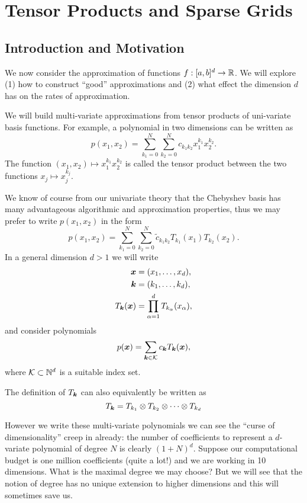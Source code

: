 
\section{Tensor Products and Sparse Grids}
%
\label{sec:sparse}

\subsection{Introduction and Motivation}
%
\label{sec:sparse:intro}
%
We now consider the approximation of functions $f : [a,b]^d \to \mathbb{R}$. We will
explore (1) how to construct ``good'' approximations and (2) what effect the
dimension $d$ has on the rates of approximation.

We will build multi-variate approximations from tensor products of uni-variate
basis functions. For example, a polynomial in two dimensions can be written
as
\[
  p(x_1, x_2) = \sum_{k_1 = 0}^N \sum_{k_2 = 0}^N c_{k_1k_2} x_1^{k_1} x_2^{k_2}.
\]
The function $(x_1, x_2) \mapsto x_1^{k_1}x_2^{k_2}$ is called the tensor
product between the two functions $x_j \mapsto x_j^{k_j}$.

We know of course from our univariate theory that the Chebyshev basis has
many advantageous algorithmic and approximation properties, thus we may
prefer to write $p(x_1, x_2)$ in the form
\[
    p(x_1, x_2) =
    \sum_{k_1 = 0}^N \sum_{k_2 = 0}^N
    \tilde{c}_{k_1k_2} T_{k_1}(x_1) T_{k_2}(x_2).
\]
In a general dimension $d > 1$ we will write
\begin{align*}
    {\bm x} &= (x_1, \dots, x_d), \\
    {\bm k} &= (k_1, \dots, k_d), \\
    T_{{\bm k}}({\bm x}) &= \prod_{\alpha = 1}^d T_{k_\alpha}(x_\alpha),
\end{align*}
and consider polynomials
\[
    p({\bm x}) = \sum_{{\bm k} \in \mathcal{K}} c_{{\bm k}} T_{{\bm k}}({\bm x}),
\]
where $\mathcal{K} \subset \mathbb{N}^d$ is a suitable index set.

The definition of $T_{{\bm k}}$ can also equivalently be written as
\[
    T_{{\bm k}} = T_{k_1} \otimes T_{k_2} \otimes \cdots \otimes T_{k_d}
\]

However we write these multi-variate polynomials we can see the ``curse of
dimensionality'' creep in already: the number of coefficients to represent a
$d$-variate polynomial of degree $N$ is clearly $(1+N)^d$. Suppose our
computational budget is one million coefficients (quite a lot!) and we are
working in 10 dimensions. What is the maximal degree we may choose? But we will
see that the notion of degree has no unique extension to higher dimensions and
this will sometimes save us.


